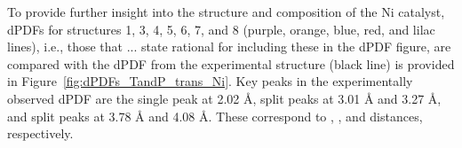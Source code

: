 To provide further insight into the structure and composition of the Ni catalyst, dPDFs for structures 1, 3, 4, 5, 6, 7, and 8 (purple, orange, blue, red, and lilac lines), i.e., those that ... state rational for including these in the dPDF figure, are compared with the dPDF from the experimental structure (black line) is provided in Figure~\ref{fig:dPDFs_TandP_trans_Ni}. Key peaks in the experimentally observed dPDF are the single peak at 2.02 {\AA}, split peaks at 3.01 {\AA} and 3.27 {\AA}, and split peaks at 3.78 {\AA} and 4.08 {\AA}. These correspond to , , and  distances, respectively. 











